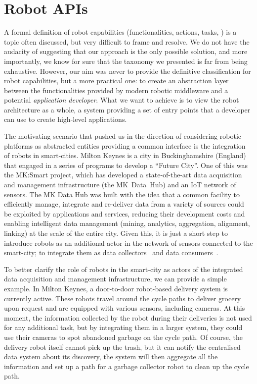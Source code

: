 \section{Robot APIs} 
A formal definition of robot capabilities (functionalities, actions, tasks, \etc) is a topic often discussed, but very difficult to frame and resolve. We do not have the audacity of suggesting that our approach is the only possible solution, and more importantly, we know for sure that the taxonomy we presented is far from being exhaustive. However, our aim was never to provide the definitive classification for robot capabilities, but a more practical one: to create an abstraction layer between the functionalities provided by modern robotic middleware and a potential \textit{application developer}. What we want to achieve is to view the robot architecture as a whole, a system providing a set of entry points that a developer can use to create high-level applications.

The motivating scenario that pushed us in the direction of considering robotic platforms as abstracted entities providing a common interface is the integration of robots in smart-cities. Milton Keynes is a city in Buckinghamshire (England) that engaged in a series of programs to develop a ``Future City''. One of this was the MK:Smart project, which has developed a state-of-the-art data acquisition and management infrastructure (the MK~Data~Hub) and an IoT network of sensors. The MK Data Hub was built with the idea that a common facility to efficiently manage, integrate and re-deliver data from a variety of sources could be exploited by applications and services, reducing their development costs and enabling intelligent data management (mining, analytics, aggregation, alignment, linking) at the scale of the entire city. Given this, it is just a short step to introduce robots as an additional actor in the network of sensors connected to the smart-city; to integrate them as data collectors~\cite{tiddi2016update} and data consumers~\cite{daga2016addressing}.

To better clarify the role of robots in the smart-city as actors of the integrated data acquisition and management infrastructure, we can provide a simple example. In Milton Keynes, a door-to-door robot-based delivery system is currently active. These robots travel around the cycle paths to deliver grocery upon request and are equipped with various sensors, including cameras. At this moment, the information collected by the robot during their deliveries is not used for any additional task, but by integrating them in a larger system, they could use their cameras to spot abandoned garbage on the cycle path. Of course, the delivery robot itself cannot pick up the trash, but it can notify the centralised data system about its discovery, the system will then aggregate all the information and set up a path for a garbage collector robot to clean up the cycle path.

